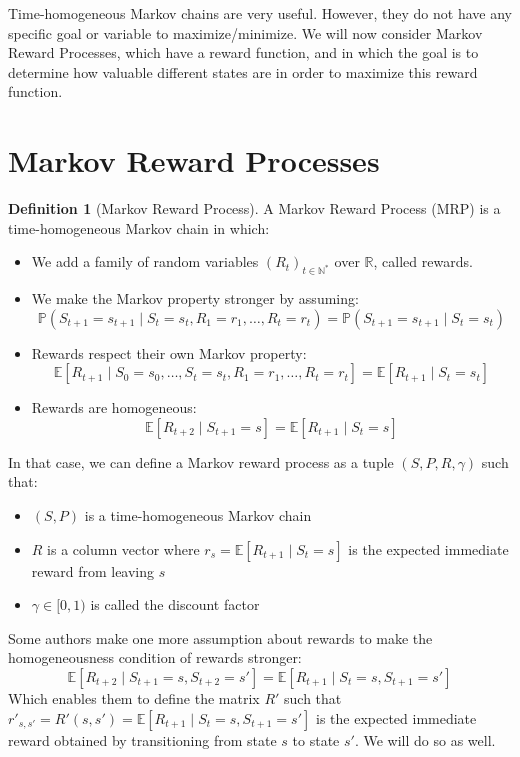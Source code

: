 \documentclass{article}
\theoremstyle{definition}
\newtheorem{definition}{Definition}[section]
\theoremstyle{remark}
\theoremstyle{example}
\begin{document}
Time-homogeneous Markov chains are very useful. However, they do not have any specific goal or variable to maximize/minimize. We will now consider Markov Reward Processes, which have a reward function, and in which the goal is to determine how valuable different states are in order to maximize this reward function.

\section{Markov Reward Processes}

\begin{definition}[Markov Reward Process]
		A Markov Reward Process (MRP) is a time-homogeneous Markov chain in which:
		\begin{itemize}
				\item We add a family of random variables $(R_t)_{t \in \mathbb{N}^*}$ over $\mathbb{R}$, called rewards.
				\item We make the Markov property stronger by assuming:
						$$\mathbb{P}(S_{t+1} = s_{t+1} \mid S_t = s_t, R_1 = r_1, \dots, R_t = r_t) = \mathbb{P}(S_{t+1} = s_{t+1} \mid S_t = s_t)$$
				\item Rewards respect their own Markov property:
						$$\mathbb{E}[R_{t+1} \mid S_0 = s_0, \dots, S_t = s_t, R_1 = r_1, \dots, R_t = r_t] = \mathbb{E}[R_{t+1} \mid S_t = s_t]$$
				\item Rewards are homogeneous:
						$$\mathbb{E}[R_{t+2} \mid S_{t+1} = s] = \mathbb{E}[R_{t+1} \mid S_t = s]$$
		\end{itemize}
		In that case, we can define a Markov reward process as a tuple $(S, P, R, \gamma)$ such that:
		\begin{itemize}
				\item $(S, P)$ is a time-homogeneous Markov chain
				\item $R$ is a column vector where $r_s = \mathbb{E}[R_{t+1} \mid S_t = s]$ is the expected immediate reward from leaving $s$
				\item $\gamma \in [0, 1)$ is called the discount factor
		\end{itemize}
		Some authors make one more assumption about rewards to make the homogeneousness condition of rewards stronger:
				$$\mathbb{E}[R_{t+2} \mid S_{t+1} = s, S_{t+2} = s'] = \mathbb{E}[R_{t+1} \mid S_t = s, S_{t+1} = s']$$
				Which enables them to define the matrix $R'$ such that $r'_{s,s'} = R'(s, s') = \mathbb{E}[R_{t+1} \mid S_t = s, S_{t+1} = s']$ is the expected immediate reward obtained by transitioning from state $s$ to state $s'$. We will do so as well.
\end{definition}
\end{document}
